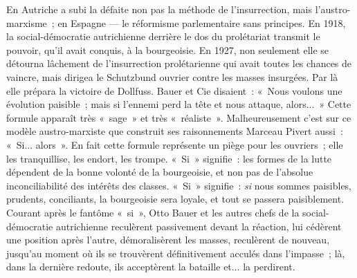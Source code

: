 \documentclass[french,twoside]{book} %
\begin{document}
En Autriche a subi la défaite non pas la méthode de l’insurrection, mais l’austro-marxisme ; en Espagne — le réformisme parlementaire sans principes. En 1918, la social-démocratie autrichienne derrière le dos du prolétariat transmit le pouvoir, qu’il avait conquis, à la bourgeoisie. En 1927, non seulement elle se détourna lâchement de l’insurrection prolétarienne qui avait toutes les chances de vaincre, mais dirigea le Schutzbund ouvrier contre les masses insurgées. Par là elle prépara la victoire de Dollfuss. Bauer et Cie disaient : « Nous voulons une évolution paisible ; mais si l’ennemi perd la tête et nous attaque, alors... » Cette formule apparaît très « sage » et très « réaliste ». Malheureusement c’est sur ce modèle austro-marxiste que construit ses raisonnements Marceau Pivert aussi : « Si... alors ». En fait cette formule représente un piège pour les ouvriers ; elle les tranquillise, les endort, les trompe. « Si » signifie : les formes de la lutte dépendent de la bonne volonté de la bourgeoisie, et non pas de l’absolue inconciliabilité des intérêts des classes. « Si » signifie : \emph{si} nous sommes paisibles, prudents, conciliants, la bourgeoisie sera loyale, et tout se passera paisiblement. Courant après le fantôme « si », Otto Bauer et les autres chefs de la social-démocratie autrichienne reculèrent passivement devant la réaction, lui cédèrent une position après l’autre, démoralisèrent les masses, reculèrent  de nouveau, jusqu’au moment où ils se trouvèrent définitivement acculés dans l’impasse ; là, dans la dernière redoute, ils acceptèrent la bataille et... la perdirent.\par
\end{document}

